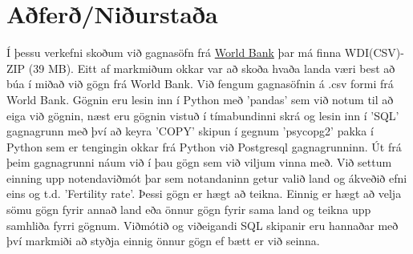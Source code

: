 \documentclass[11pt,a4paper]{amsart}
\theoremstyle{plain}
\theoremstyle{definition}
\theoremstyle{remark}
\begin{document}


\section{Aðferð/Niðurstaða}
Í þessu verkefni skoðum við gagnasöfn frá \href{http://data.worldbank.org/data-catalog/world-development-indicators}{World Bank} þar má finna WDI(CSV)-ZIP (39 MB). Eitt af markmiðum okkar var að skoða hvaða landa væri best að búa í miðað við gögn frá World Bank. Við fengum gagnasöfnin á .csv formi frá World Bank. Gögnin eru lesin inn í Python með 'pandas' sem við notum til að eiga við gögnin, næst eru gögnin vistuð í tímabundinni skrá og lesin inn í 'SQL' gagnagrunn með því að keyra 'COPY' skipun í gegnum 'psycopg2' pakka í Python sem er tengingin okkar frá Python við Postgresql gagnagrunninn. Út frá þeim gagnagrunni náum við í þau gögn sem við viljum vinna með. Við settum einning upp notendaviðmót þar sem notandaninn getur valið land og ákveðið efni eins og t.d. 'Fertility rate'. Þessi gögn er hægt að teikna. Einnig er hægt að velja sömu gögn fyrir annað land eða önnur gögn fyrir sama land og teikna upp samhliða fyrri gögnum. Viðmótið og viðeigandi SQL skipanir eru hannaðar með því markmiði að styðja einnig önnur gögn ef bætt er við seinna.
\end{document}
